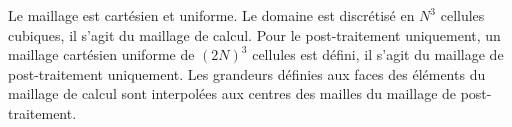 Le maillage est cartésien et uniforme. Le domaine est discrétisé en $N^3$ cellules cubiques, il s'agit du maillage de calcul. Pour le post-traitement uniquement, un maillage cartésien uniforme de $(2N)^3$ cellules est défini, il s'agit du maillage de post-traitement uniquement. Les grandeurs définies aux faces des éléments du maillage de calcul sont interpolées aux centres des mailles du maillage de post-traitement.